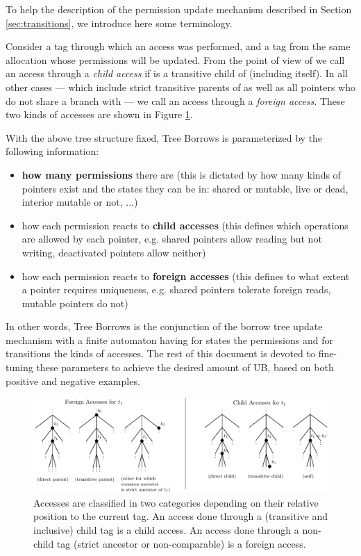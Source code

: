 \documentclass[a4paper,11pt]{article}
\theoremstyle{plain}
\theoremstyle{definition}
\theoremstyle{remark}
\newcommand{\tcode}[1]{\rstinline{#1}}
\begin{document}
To help the description of the permission update mechanism described in
Section \ref{sec:transitions}, we introduce here some terminology.

Consider a tag \tcode{t0} through which an access was performed, and a tag
\tcode{t1} from the same allocation whose permissions will be updated. From the point
of view of \tcode{t1} we call an access through \tcode{t0} a \textit{child access}
if \tcode{t0} is a transitive child of \tcode{t1} (including \tcode{t1} itself).
In all other cases --- which include strict transitive parents of \tcode{t1} as well as
all pointers who do not share a branch with \tcode{t1} --- we call an access through
\tcode{t0} a \textit{foreign access}. These two kinds of accesses are shown
in Figure \ref{fig:kinds-of-accesses}.

With the above tree structure fixed, Tree Borrows is parameterized by the following information:
\begin{itemize}
    \item \textbf{how many permissions} there are
        (this is dictated by how many kinds of pointers exist and the states they can be in:
        shared or mutable, live or dead, interior mutable or not, ...)
    \item how each permission reacts to \textbf{child accesses}
        (this defines which operations are allowed by each pointer, e.g. shared pointers allow
        reading but not writing, deactivated pointers allow neither)
    \item how each permission reacts to \textbf{foreign accesses}
        (this defines to what extent a pointer requires uniqueness, e.g.
        shared pointers tolerate foreign reads, mutable pointers do not)
\end{itemize}
In other words, Tree Borrows is the conjunction of the borrow tree update mechanism
with a finite automaton having for states the permissions and for transitions the
kinds of accesses.
The rest of this document is devoted to fine-tuning these parameters to
achieve the desired amount of UB, based on both positive and negative examples.

\begin{figure}
    \includegraphics[width=\textwidth]{../figs/accesses-kinds.pdf}
    \caption{Accesses are classified in two categories depending on their relative position
    to the current tag. An access done through a (transitive and inclusive) child tag is a child access.
    An access done through a non-child tag (strict ancestor or non-comparable) is a foreign access.}
    \label{fig:kinds-of-accesses}
\end{figure}
\end{document}

